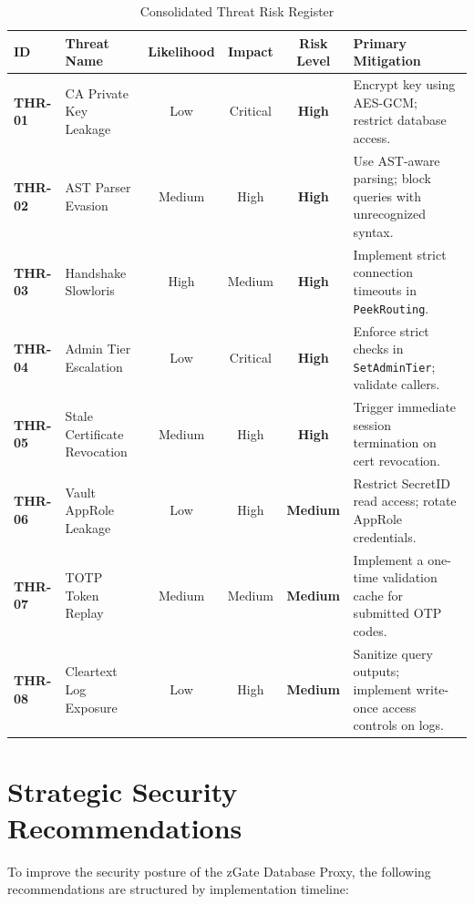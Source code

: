 \begin{table}[H]
\centering
\small
\renewcommand{\arraystretch}{1.2}
\begin{tabularx}{\textwidth}{l p{3.2cm} c c c X}
\toprule
\textbf{ID} & \textbf{Threat Name} & \textbf{Likelihood} & \textbf{Impact} & \textbf{Risk Level} & \textbf{Primary Mitigation} \\
\midrule
\textbf{THR-01} & CA Private Key Leakage & Low & Critical & \textbf{High} & Encrypt key using AES-GCM; restrict database access. \\
\textbf{THR-02} & AST Parser Evasion & Medium & High & \textbf{High} & Use AST-aware parsing; block queries with unrecognized syntax. \\
\textbf{THR-03} & Handshake Slowloris & High & Medium & \textbf{High} & Implement strict connection timeouts in \texttt{PeekRouting}. \\
\textbf{THR-04} & Admin Tier Escalation & Low & Critical & \textbf{High} & Enforce strict checks in \texttt{SetAdminTier}; validate callers. \\
\textbf{THR-05} & Stale Certificate Revocation & Medium & High & \textbf{High} & Trigger immediate session termination on cert revocation. \\
\textbf{THR-06} & Vault AppRole Leakage & Low & High & \textbf{Medium} & Restrict SecretID read access; rotate AppRole credentials. \\
\textbf{THR-07} & TOTP Token Replay & Medium & Medium & \textbf{Medium} & Implement a one-time validation cache for submitted OTP codes. \\
\textbf{THR-08} & Cleartext Log Exposure & Low & High & \textbf{Medium} & Sanitize query outputs; implement write-once access controls on logs. \\
\bottomrule
\end{tabularx}
\caption{Consolidated Threat Risk Register}
\label{tab:risk-register}
\end{table}

\section{Strategic Security Recommendations}

To improve the security posture of the zGate Database Proxy, the following recommendations are structured by implementation timeline:


